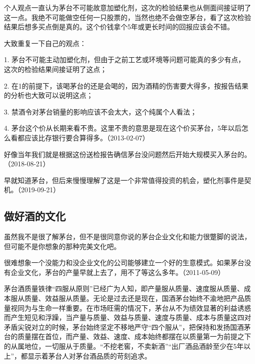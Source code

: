 
个人观点一直认为茅台不可能故意加塑化剂，这次的检验结果也从侧面间接证明了这一点。我绝不可能做空任何一只股票的，当然也绝不会做空茅台，看了这次检验结果后想多买点倒是真的。这个价钱拿个5年或更长时间的回报应该会不错。

大致重复一下自己的观点：

1. 茅台不可能主动加塑化剂，但由于之前工艺或环境等问题可能真的多少有点，这次的检验结果间接证明了这点；

2. 在1的前提下，该喝茅台的还是会喝的，因为酒精的伤害要大得多，按报告结果的分析也大致可以说明这点；

3. 禁酒令对茅台销量的影响应该不会太大，这个纯属个人看法；

4. 茅台这个价从长期来看不贵。这里不贵的意思是现在这个价买茅台，5年以后怎么看都应该比存银行要合算得多。（2013-02-07）

好像当年我们就是根据这份送检报告确信茅台没问题然后开始大规模买入茅台的。（2018-08-21）


早就知道茅台，但后来慢慢理解了这是一个非常值得投资的机会，塑化剂事件是契机。（2019-09-21）

\subsection{做好酒的文化}


虽然我不是很了解茅台，但不是很同意你说的茅台企业文化和能力很蹩脚的说法，但可能不是你想象的那种完美文化吧。

很难想象一个没能力和没企业文化的公司能够建立一个好的生意模式。如果茅台没有企业文化，茅台的产量早就上去了，用不了等这么多年。（2011-05-09）


茅台酒质量铁律“四服从原则”已经广为人知，即产量服从质量、速度服从质量、成本服从质量、效益服从质量。无论是过去还是现在，国酒茅台始终不渝地把产品质量视同为与生命一样重要。在市场旺需的情况下，茅台从不为绩效显著的利益诱惑而产生短见和浮躁，当产量与质量、效益与质量、速度与质量、成本与质量这四对矛盾尖锐对立的时候，茅台始终坚定不移地严守“四个服从”，把保持和发扬国酒茅台的质量摆在首位，而产量、效益、速度、成本始终都摆在以质量第一为前提之下的从属地位，一切服从于质量。“不挖老窖，不卖新酒”“出厂酒品酒龄至少在5年以上”，都显示着茅台人对茅台酒品质的苛刻追求。

